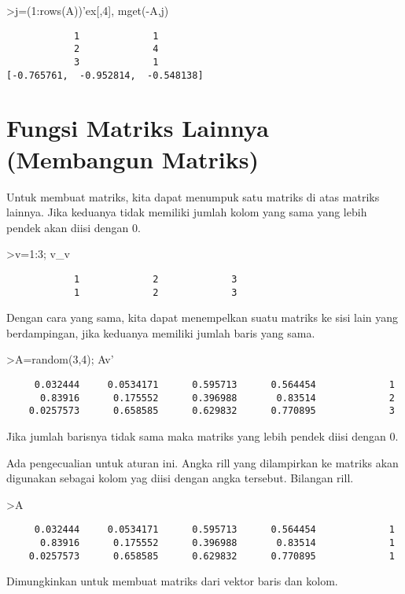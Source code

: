 \documentclass[
]{book}
\begin{document}
\textgreater j=(1:rows(A))'\textbar ex{[},4{]}, mget(-A,j)

\begin{verbatim}
            1             1 
            2             4 
            3             1 
[-0.765761,  -0.952814,  -0.548138]
\end{verbatim}

\chapter{Fungsi Matriks Lainnya (Membangun Matriks)}\label{fungsi-matriks-lainnya-membangun-matriks}

Untuk membuat matriks, kita dapat menumpuk satu matriks di atas matriks lainnya. Jika keduanya tidak memiliki jumlah kolom yang sama yang lebih pendek akan diisi dengan 0.

\textgreater v=1:3; v\_v

\begin{verbatim}
            1             2             3 
            1             2             3 
\end{verbatim}

Dengan cara yang sama, kita dapat menempelkan suatu matriks ke sisi lain yang berdampingan, jika keduanya memiliki jumlah baris yang sama.

\textgreater A=random(3,4); A\textbar v'

\begin{verbatim}
     0.032444     0.0534171      0.595713      0.564454             1 
      0.83916      0.175552      0.396988       0.83514             2 
    0.0257573      0.658585      0.629832      0.770895             3 
\end{verbatim}

Jika jumlah barisnya tidak sama maka matriks yang lebih pendek diisi dengan 0.

Ada pengecualian untuk aturan ini. Angka rill yang dilampirkan ke matriks akan digunakan sebagai kolom yag diisi dengan angka tersebut. Bilangan rill.

\textgreater A

\begin{verbatim}
     0.032444     0.0534171      0.595713      0.564454             1 
      0.83916      0.175552      0.396988       0.83514             1 
    0.0257573      0.658585      0.629832      0.770895             1 
\end{verbatim}

Dimungkinkan untuk membuat matriks dari vektor baris dan kolom.
\end{document}
